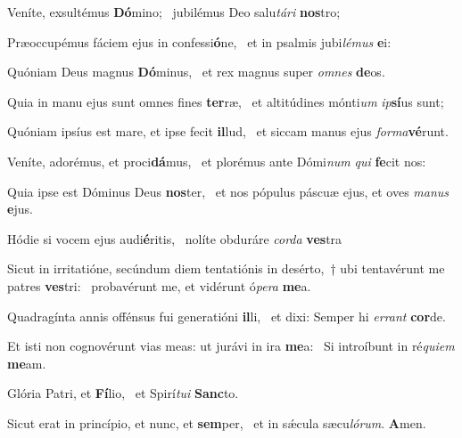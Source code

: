 \item Veníte, exsultémus \textbf{Dó}mino;~\psstar{} jubilémus Deo salu\textit{tári} \textbf{nos}tro;

\item Præoccupémus fáciem ejus in confessi\textbf{ó}ne,~\psstar{} et in psalmis jubi\textit{lémus} \textbf{e}i:

\item Quóniam Deus magnus \textbf{Dó}minus,~\psstar{} et rex magnus super \textit{omnes} \textbf{de}os.

\item Quia in manu ejus sunt omnes fines \textbf{ter}ræ,~\psstar{} et altitúdines mónti\textit{um} \textit{ip}\textbf{sí}us sunt;\\

\item Quóniam ipsíus est mare, et ipse fecit \textbf{il}lud,~\psstar{} et siccam manus ejus \textit{forma}\textbf{vé}runt.

\item Veníte, adorémus, et proci\textbf{dá}mus,~\psstar{} et plorémus ante Dómi\textit{num} \textit{qui} \textbf{fe}cit nos:

\item Quia ipse est Dóminus Deus \textbf{nos}ter,~\psstar{} et nos pópulus páscuæ ejus, et oves \textit{manus} \textbf{e}jus.\\

\item Hódie si vocem ejus audi\textbf{é}ritis,~\psstar{} nolíte obduráre \textit{corda} \textbf{ves}tra

\item Sicut in irritatióne, secúndum diem tentatiónis in desérto,~† ubi tentavérunt me patres \textbf{ves}tri:~\psstar{} probavérunt me, et vidérunt ó\textit{pera} \textbf{me}a.

\item Quadragínta annis offénsus fui generatióni \textbf{il}li,~\psstar{} et dixi: Semper hi \textit{errant} \textbf{cor}de.

\item Et isti non cognovérunt vias meas: ut jurávi in ira \textbf{me}a:~\psstar{} Si introíbunt in ré\textit{quiem} \textbf{me}am.

\item Glória Patri, et \textbf{Fí}lio,~\psstar{} et Spirí\textit{tui} \textbf{Sanc}to.

\item Sicut erat in princípio, et nunc, et \textbf{sem}per,~\psstar{} et in sǽcula sæcu\textit{lórum}. \textbf{A}men.\\
